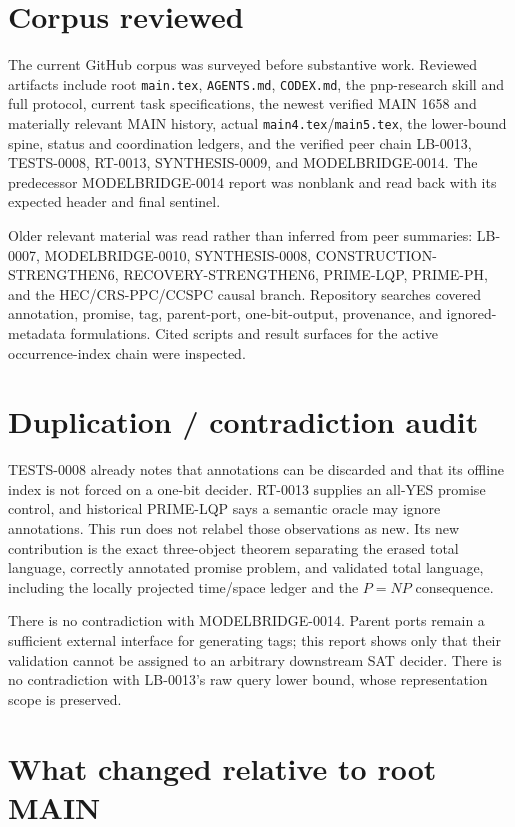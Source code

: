 \documentclass[11pt]{article}
\begin{document}
\section{Corpus reviewed}

The current GitHub corpus was surveyed before substantive work.  Reviewed
artifacts include root \texttt{main.tex}, \texttt{AGENTS.md},
\texttt{CODEX.md}, the pnp-research skill and full protocol, current task
specifications, the newest verified MAIN 1658 and materially relevant MAIN
history, actual \texttt{main4.tex}/\texttt{main5.tex}, the lower-bound spine,
status and coordination ledgers, and the verified peer chain LB-0013,
TESTS-0008, RT-0013, SYNTHESIS-0009, and MODELBRIDGE-0014.  The predecessor
MODELBRIDGE-0014 report was nonblank and read back with its expected header
and final sentinel.

Older relevant material was read rather than inferred from peer summaries:
LB-0007, MODELBRIDGE-0010, SYNTHESIS-0008, CONSTRUCTION-STRENGTHEN6,
RECOVERY-STRENGTHEN6, PRIME-LQP, PRIME-PH, and the HEC/CRS-PPC/CCSPC causal
branch.  Repository searches covered annotation, promise, tag, parent-port,
one-bit-output, provenance, and ignored-metadata formulations.  Cited scripts
and result surfaces for the active occurrence-index chain were inspected.

\section{Duplication / contradiction audit}

TESTS-0008 already notes that annotations can be discarded and that its
offline index is not forced on a one-bit decider.  RT-0013 supplies an all-YES
promise control, and historical PRIME-LQP says a semantic oracle may ignore
annotations.  This run does not relabel those observations as new.  Its new
contribution is the exact three-object theorem separating the erased total
language, correctly annotated promise problem, and validated total language,
including the locally projected time/space ledger and the $P=NP$ consequence.

There is no contradiction with MODELBRIDGE-0014.  Parent ports remain a
sufficient external interface for generating tags; this report shows only
that their validation cannot be assigned to an arbitrary downstream SAT
decider.  There is no contradiction with LB-0013's raw query lower bound,
whose representation scope is preserved.

\section{What changed relative to root MAIN}
\end{document}
